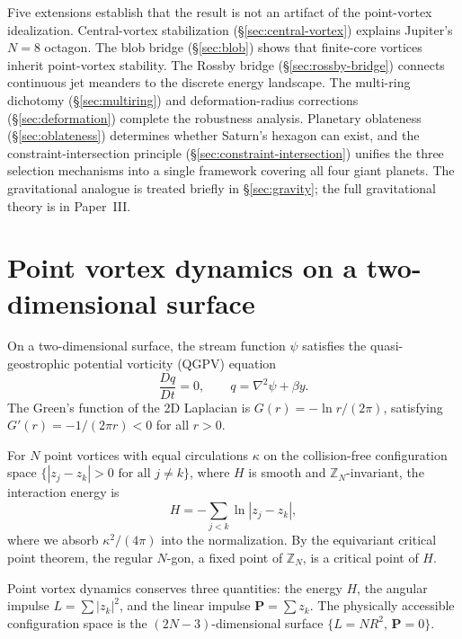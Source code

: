 Five extensions establish that the result is not an
artifact of the point-vortex idealization.
Central-vortex stabilization (\S\ref{sec:central-vortex})
explains Jupiter's $N = 8$ octagon.
The blob bridge (\S\ref{sec:blob}) shows that
finite-core vortices inherit point-vortex stability.
The Rossby bridge (\S\ref{sec:rossby-bridge})
connects continuous jet meanders to the discrete
energy landscape.
The multi-ring dichotomy (\S\ref{sec:multiring}) and
deformation-radius corrections (\S\ref{sec:deformation})
complete the robustness analysis.
Planetary oblateness (\S\ref{sec:oblateness}) determines
whether Saturn's hexagon can exist, and the
constraint-intersection principle (\S\ref{sec:constraint-intersection})
unifies the three selection mechanisms into a single
framework covering all four giant planets.
The gravitational analogue is treated briefly in
\S\ref{sec:gravity}; the full gravitational theory
is in Paper~III.


\section{Point vortex dynamics on a two-dimensional surface}
\label{sec:pvd}

On a two-dimensional surface, the stream function $\psi$ satisfies the
quasi-geostrophic potential vorticity (QGPV) equation
\begin{equation}\label{eq:qgpv}
  \frac{Dq}{Dt} = 0, \qquad q = \nabla^2\psi + \beta y.
\end{equation}
The Green's function of the 2D Laplacian is
$G(r) = -\ln r / (2\pi)$,
satisfying $G'(r) = -1/(2\pi r) < 0$ for all $r > 0$.

For $N$ point vortices with equal circulations $\kappa$ on the
collision-free configuration space $\{|z_j - z_k| > 0 \text{ for all }
j \ne k\}$, where $H$ is smooth and $\mathbb{Z}_N$-invariant, the
interaction energy is
\begin{equation}\label{eq:thomson-H}
  H = -\sum_{j < k} \ln|z_j - z_k|,
\end{equation}
where we absorb $\kappa^2/(4\pi)$ into the normalization.
By the equivariant critical point theorem, the regular $N$-gon, a
fixed point of $\mathbb{Z}_N$, is a critical point of $H$.

Point vortex dynamics conserves three quantities: the energy $H$,
the angular impulse $L = \sum|z_k|^2$, and the linear impulse
$\mathbf{P} = \sum z_k$.  The physically accessible configuration
space is the $(2N-3)$-dimensional surface
$\{L = NR^2,\, \mathbf{P} = 0\}$.

